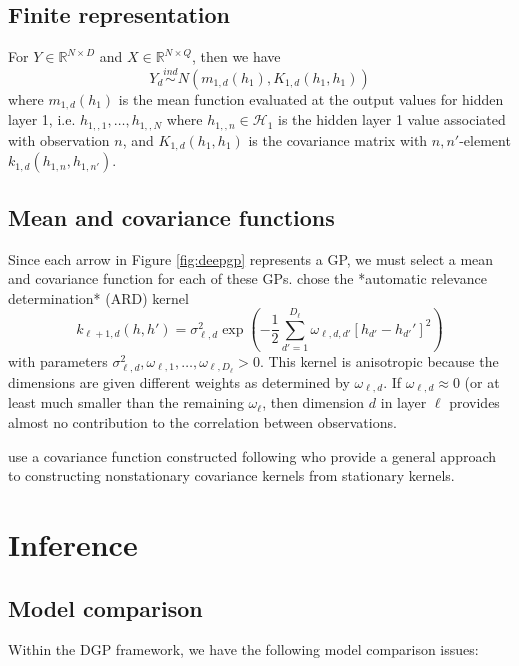 \documentclass{article}
\newcommand{\ind}{\stackrel{ind}{\sim}}
\newcommand{\1}{\mathbbm{1}}
\begin{document}
\subsection{Finite representation}

For $Y \in \mathbb{R}^{N \times D}$ and $X\in \mathbb{R}^{N\times Q}$,
then we have 
\[
Y_d \ind N(m_{1,d}(h_1), K_{1,d}(h_1,h_1))
\]
where 
$m_{1,d}(h_1)$ is the mean function evaluated at the output values for 
hidden layer 1, i.e. $h_{1,,1},\ldots,h_{1,,N}$ where $h_{1,,n}\in \mathcal{H}_1$
is the hidden layer 1 value associated with observation $n$, and 
$K_{1,d}(h_1,h_1)$ is the covariance matrix with $n,n'$-element
$k_{1,d}(h_{1,n},h_{1,n'})$.


\subsection{Mean and covariance functions}

Since each arrow in Figure \ref{fig:deepgp} represents a GP, 
we must select a mean and covariance function for each of these GPs. 
\cite{damianou2013deep} chose the *automatic relevance determination* (ARD) 
kernel
\[
k_{\ell+1,d}(h,h') = 
\sigma^2_{\ell,d} \exp\left(-\frac{1}{2} \sum_{d'=1}^{D_\ell} \omega_{\ell,d,d'} \left[ h_{d'} - h_{d'}' \right]^2\right)
\]
with parameters $\sigma^2_{\ell,d},\omega_{\ell,1},\ldots,\omega_{\ell,D_\ell} > 0$.
This kernel is anisotropic because the dimensions are given different weights
as determined by $\omega_{\ell,d}$.
If $\omega_{\ell,d} \approx 0$ (or at least much smaller than the remaining $\omega_{\ell}$, 
then dimension $d$ in layer $\ell$ provides almost no contribution to the correlation between
observations.

\cite{dunlop2018deep} use a covariance function constructed following 
\cite{paciorek2004nonstationary} who provide a general approach to constructing
nonstationary covariance kernels from stationary kernels.




\section{Inference}

\subsection{Model comparison}

Within the DGP framework,
we have the following model comparison issues:
\end{document}
